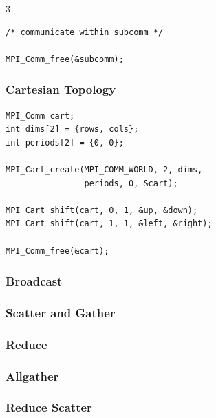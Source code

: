 \documentclass[12pt, a4paper]{article}
\begin{document}
\begin{multicols*}{3}
\begin{lstlisting}[basicstyle=\ttfamily\scriptsize]
/* communicate within subcomm */

MPI_Comm_free(&subcomm);
\end{lstlisting}

\subsubsection{Cartesian Topology}
\begin{lstlisting}[basicstyle=\ttfamily\scriptsize]
MPI_Comm cart;
int dims[2] = {rows, cols};
int periods[2] = {0, 0};

MPI_Cart_create(MPI_COMM_WORLD, 2, dims,
                periods, 0, &cart);

MPI_Cart_shift(cart, 0, 1, &up, &down);
MPI_Cart_shift(cart, 1, 1, &left, &right);

MPI_Comm_free(&cart);
\end{lstlisting}

\subsubsection{Broadcast}
\begin{center}
\end{center}
\colbreak

\subsubsection{Scatter and Gather}
\begin{center}
\end{center}

\subsubsection{Reduce}
\begin{center}
\end{center}

\subsubsection{Allgather}
\begin{center}
\end{center}

\subsubsection{Reduce Scatter}
\begin{center}
\end{center}


\end{multicols*}
\end{document}
